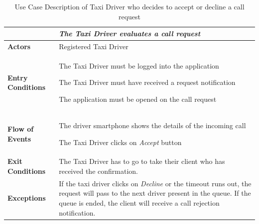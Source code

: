 \documentclass[a4paper]{article}
\begin{document}
\begin{table} [H]
\begin{center}
\begin{tabular}{ |m{}|m{}|  }
\hline
    \multicolumn{2}{|c|}{\textbf{\textit{The Taxi Driver evaluates a call request}}} \\
\hline \hline
    \textbf{Actors}
&   Registered Taxi Driver
\\ \hline
    \textbf{Entry Conditions}
&   
    \begin{itemize*}
    \item The Taxi Driver must be logged into the application
    \item The Taxi Driver must have received a request notification
    \item The application must be opened on the call request
    \end{itemize*}
\\ \hline
    \textbf{Flow of Events}
& 
    \begin{enumerate*}
    \item The driver smartphone shows the details of the incoming call
    \item The Taxi Driver clicks on \emph{Accept} button
    \end{enumerate*}
\\ \hline
    \textbf{Exit Conditions}
&  The Taxi Driver has to go to take their client who has received the confirmation.
\\ \hline
    \textbf{Exceptions}
&   If the taxi driver clicks on \emph{Decline} or the timeout runs out, the request will pass to the next driver present in the queue. \newline
If the queue is ended, the client will receive a call rejection notification.
\\ \hline
\end{tabular}
\end{center}
\caption{Use Case Description of Taxi Driver who decides to accept or decline a call request}
\label{table:taxievaluateriderequest}
\end{table}
\end{document}
